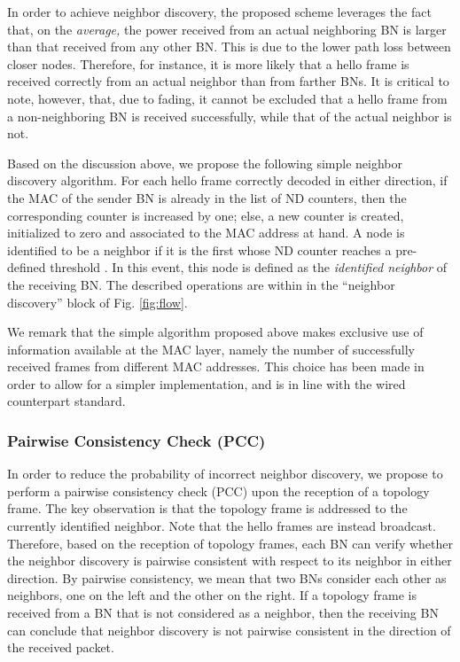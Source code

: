 \documentclass[10pt,english,two column]{IEEEtran}
\begin{document}
In order to achieve neighbor discovery, the proposed scheme leverages
the fact that, on the\emph{ average, }the power received from an actual
neighboring BN is larger than that received from any other BN. This
is due to the lower path loss between closer nodes. Therefore, for
instance, it is more likely that a hello frame is received correctly
from an actual neighbor than from farther BNs. It is critical to note,
however, that, due to fading, it cannot be excluded that a hello frame
from a non-neighboring BN is received successfully, while that of
the actual neighbor is not. 

Based on the discussion above, we propose the following simple neighbor
discovery algorithm. For each hello frame correctly decoded in either
direction, if the MAC of the sender BN is already in the list of ND
counters, then the corresponding counter is increased by one; else,
a new counter is created, initialized to zero and associated to the
MAC address at hand. A node is identified to be a neighbor if it is
the first whose ND counter reaches a pre-defined threshold .
In this event, this node is defined as the \textit{identified neighbor}
of the receiving BN. The described operations are within in the ``neighbor
discovery'' block of Fig. \ref{fig:flow}.

We remark that the simple algorithm proposed above makes exclusive
use of information available at the MAC layer, namely the number of
successfully received frames from different MAC addresses. This choice
has been made in order to allow for a simpler implementation, and
is in line with the wired counterpart standard. 


\subsubsection{Pairwise Consistency Check (PCC) \label{sub:Pairwise-Consistency-Check}}

In order to reduce the probability of incorrect neighbor discovery,
we propose to perform a pairwise consistency check (PCC) upon the
reception of a topology frame. The key observation is that the topology
frame is addressed to the currently identified neighbor. Note that
the hello frames are instead broadcast. Therefore, based on the reception
of topology frames, each BN can verify whether the neighbor discovery
is pairwise consistent with respect to its neighbor in either direction.
By pairwise consistency, we mean that two BNs consider each other
as neighbors, one on the left and the other on the right. If a topology
frame is received from a BN that is not considered as a neighbor,
then the receiving BN can conclude that neighbor discovery is not
pairwise consistent in the direction of the received packet. 
\end{document}
